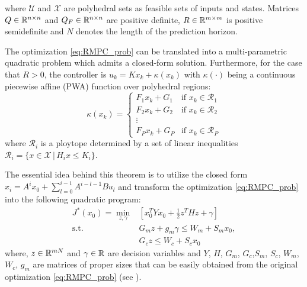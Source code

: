 %
where $\mathcal U$ and $\mathcal X$ are polyhedral sets as feasible sets of inputs and states. Matrices $Q\in\mathbb{R}^{n\times n}$ and $Q_F\in\mathbb{R}^{n\times n}$ are positive definite, $R\in\mathbb{R}^{m\times m}$ is positive semidefinite and $N$ denotes the length of the prediction horizon.
\begin{theorem}
The optimization  \eqref{eq:RMPC_prob} can be translated into a multi-parametric quadratic problem which admits a closed-form solution. Furthermore, for the case that $R>0$, the controller is $u_k = K x_k + \kappa(x_k)$ with $\kappa(\cdot)$ being a continuous piecewise affine (PWA) function over polyhedral regions:
\begin{equation}
\kappa(x_k)=
\begin{cases}
F_1x_k+G_1 & \text{if $x_k\in \mathcal{R}_1$}\\
F_2x_k+G_2 & \text{if $x_k\in \mathcal{R}_2$}\\
\vdots\\
F_Px_k+G_P & \text{if $x_k\in \mathcal{R}_P$}
\end{cases} 
\end{equation}
where $\mathcal{R}_i$ is a ploytope determined by a set of linear inequalities $\mathcal R_i = \{x\in\mathcal X\,|\,H_ix\leq K_i\}$. 
\end{theorem}
The essential idea behind this theorem is to utilize the closed form $x_i=A^ix_0+\sum_{l=0}^{i-1}A^{i-l-1}Bu_l$ and transform the optimization \eqref{eq:RMPC_prob} into the following quadratic program:
\begin{align}
\label{eq:multi_param_prog}
J^{\ast}(x_0)=\min_{z,\gamma}& \left[x_0^TYx_0+\frac{1}{2}z^THz+\gamma\right]\\
\text{s.t.} \quad &G_mz+g_m\gamma\leq W_m+S_mx_0,\nonumber\\
&G_cz\leq W_c+S_cx_0\nonumber
\end{align}
where, $z\in \mathbb{R}^{mN}$ and $\gamma\in\mathbb{R}$ are decision variables and $Y$, $H$, $G_m$, $G_c$,$S_m$, $S_c$, $W_m$, $W_c$, $g_m$ are matrices of proper sizes that can be easily obtained from the original optimization \eqref{eq:RMPC_prob}  (see \cite{delaPea:2005}).


